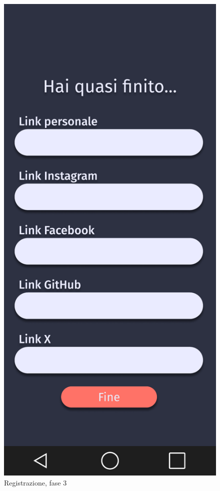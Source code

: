 \begin{figure}[!htb]
\begin{minipage}{0.32\textwidth}
            \includegraphics[width=.7\linewidth]{Immagini/Frames/10.pdf}
            \caption{Registrazione, fase 3}
        \end{minipage}\hfill
        \begin{minipage}{0.32\textwidth}
            \centering

\end{minipage}
\end{figure}

